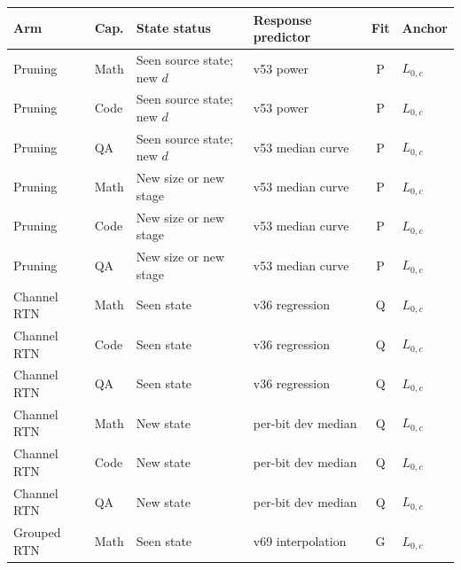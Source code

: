 \begin{table}[H]
\centering\small
\setlength{\tabcolsep}{3pt}\renewcommand{\arraystretch}{1.05}
\begin{tabular}{@{}llllcl@{}}
\toprule
Arm & Cap. & State status & Response predictor & Fit & Anchor \\
\midrule
Pruning & Math & Seen source state; new $d$ & v53 power & P & $L_{0,c}$ \\
Pruning & Code & Seen source state; new $d$ & v53 power & P & $L_{0,c}$ \\
Pruning & QA & Seen source state; new $d$ & v53 median curve & P & $L_{0,c}$ \\
Pruning & Math & New size or new stage & v53 median curve & P & $L_{0,c}$ \\
Pruning & Code & New size or new stage & v53 median curve & P & $L_{0,c}$ \\
Pruning & QA & New size or new stage & v53 median curve & P & $L_{0,c}$ \\
\addlinespace
Channel RTN & Math & Seen state & v36 regression & Q & $L_{0,c}$ \\
Channel RTN & Code & Seen state & v36 regression & Q & $L_{0,c}$ \\
Channel RTN & QA & Seen state & v36 regression & Q & $L_{0,c}$ \\
Channel RTN & Math & New state & per-bit dev median & Q & $L_{0,c}$ \\
Channel RTN & Code & New state & per-bit dev median & Q & $L_{0,c}$ \\
Channel RTN & QA & New state & per-bit dev median & Q & $L_{0,c}$ \\
\addlinespace
Grouped RTN & Math & Seen state & v69 interpolation & G & $L_{0,c}$ \\

\end{tabular}
\end{table}
